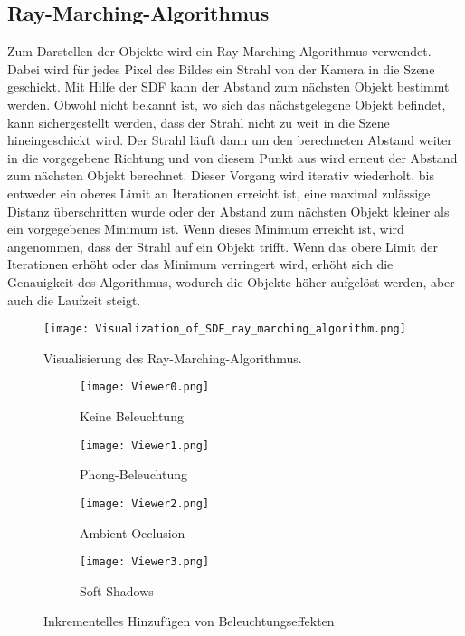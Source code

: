 \subsection{Ray-Marching-Algorithmus}
Zum Darstellen der Objekte wird ein Ray-Marching-Algorithmus verwendet.
Dabei wird für jedes Pixel des Bildes ein Strahl von der Kamera in die Szene geschickt.
Mit Hilfe der SDF kann der Abstand zum nächsten Objekt bestimmt werden.
Obwohl nicht bekannt ist, wo sich das nächstgelegene Objekt befindet, kann sichergestellt werden, dass der Strahl nicht zu weit in die Szene hineingeschickt wird.
Der Strahl läuft dann um den berechneten Abstand weiter in die vorgegebene Richtung und von diesem Punkt aus wird erneut der Abstand zum nächsten Objekt berechnet.
Dieser Vorgang wird iterativ wiederholt, bis entweder ein oberes Limit an Iterationen erreicht ist, eine maximal zulässige Distanz überschritten wurde oder der Abstand zum nächsten Objekt kleiner als ein vorgegebenes Minimum ist.
Wenn dieses Minimum erreicht ist, wird angenommen, dass der Strahl auf ein Objekt trifft.
Wenn das obere Limit der Iterationen erhöht oder das Minimum verringert wird, erhöht sich die Genauigkeit des Algorithmus, wodurch die Objekte höher aufgelöst werden, aber auch die Laufzeit steigt.

\begin{figure}[!htbp]\centering
    \texttt{[image: Visualization\_of\_SDF\_ray\_marching\_algorithm.png]}
    \caption{Visualisierung des Ray-Marching-Algorithmus. \cite{wikimedia_sdf}}
    \label{fig:ray_marching}
\end{figure}

\begin{figure}[!htbp]\centering
    \begin{subfigure}[t]{0.2\textwidth}
        \texttt{[image: Viewer0.png]}
        \caption{Keine Beleuchtung}
        \label{fig:lighting:none}
    \end{subfigure}
    \hfill
    \begin{subfigure}[t]{0.2\textwidth}
        \centering
        \texttt{[image: Viewer1.png]}
        \caption{Phong-Beleuchtung}
        \label{fig:lighting:phong}
    \end{subfigure}
    \hfill
    \begin{subfigure}[t]{0.2\textwidth}
        \centering
        \texttt{[image: Viewer2.png]}
        \caption{Ambient Occlusion}
        \label{fig:lighting:ao}
    \end{subfigure}
    \hfill
    \begin{subfigure}[t]{0.2\textwidth}
        \centering
        \texttt{[image: Viewer3.png]}
        \caption{Soft Shadows}
        \label{fig:lighting:soft}
    \end{subfigure}
    \caption{Inkrementelles Hinzufügen von Beleuchtungseffekten}
    \label{fig:lighting}
\end{figure}

